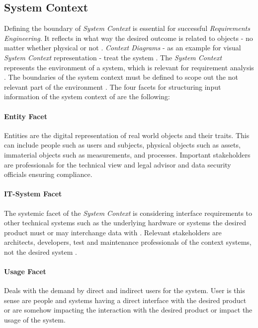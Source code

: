 \subsection{System Context}
Defining the boundary of \textit{System Context} is essential for successful \textit{Requirements Engineering}. It reflects in what way the desired outcome is related to objects - no matter whether physical or not \parencite[55]{Pohl.2007}. \textit{Context Diagrams} - as an example for visual \textit{System Context} representation - treat the system  \parencite[76]{Lauesen.2008}. The \textit{System Context} represents the environment of a system, which is relevant for requirement analysis \parencite[55]{Pohl.2007}. The boundaries of the system context must be defined to scope out the not relevant part of the environment \parencite[55-56]{Pohl.2007}. The four facets for structuring input information of the system context of \textcite{Pohl.2007} are the following:
\paragraph*{Entity Facet} 
Entities are the digital representation of real world objects and their traits. This can include people such as users and subjects, physical objects such as assets, immaterial objects such as measurements, and processes. Important stakeholders are  professionals for the technical view and legal advisor and data security officials ensuring compliance. \parencite[cf.][70-71]{Pohl.2007}
\paragraph*{IT-System Facet}
The systemic facet of the \textit{System Context} is considering interface requirements to other technical systems such as the underlying hardware or systems the desired product must or may interchange data with \parencite[cf.][192]{Kotonya.2000}. Relevant stakeholders are architects, developers, test and maintenance professionals of the context systems, not the desired system \parencite[cf.][72]{Pohl.2007}.
\paragraph*{Usage Facet} Deals with the demand by direct and indirect users for the system. User is this sense are people and systems having a direct interface with the desired product or are somehow impacting the interaction with the desired product or impact the usage of the system. \parencite[cf.][75-77]{Pohl.2007}
